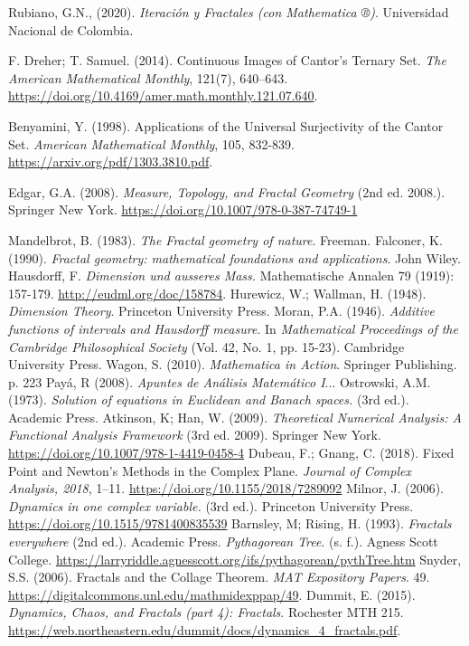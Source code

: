 \begin{thebibliography}{99}
    
 Rubiano, G.N., (2020). \textit{Iteración y Fractales (con Mathematica ®)}. Universidad Nacional de Colombia.

 F. Dreher; T. Samuel. (2014). Continuous Images of Cantor’s Ternary Set. \textit{The American Mathematical Monthly}, 121(7), 640–643. \url{https://doi.org/10.4169/amer.math.monthly.121.07.640}.

 Benyamini, Y. (1998). Applications of the Universal Surjectivity of the Cantor Set. \textit{American Mathematical Monthly}, 105, 832-839. \url{https://arxiv.org/pdf/1303.3810.pdf}.

 Edgar, G.A. (2008). \textit{Measure, Topology, and Fractal Geometry} (2nd ed. 2008.). Springer New York. \url{https://doi.org/10.1007/978-0-387-74749-1}

 Mandelbrot, B. (1983). \textit{The Fractal geometry of nature}. Freeman.
 Falconer, K. (1990). \textit{Fractal geometry: mathematical foundations and applications}. John Wiley.
 Hausdorff, F. \textit{Dimension und ausseres Mass.} Mathematische Annalen 79 (1919): 157-179. \url{http://eudml.org/doc/158784}.
Hurewicz, W.; Wallman, H. (1948). \textit{Dimension Theory}. Princeton University Press.
Moran, P.A. (1946). \textit{Additive functions of intervals and Hausdorff measure}. In \textit{Mathematical Proceedings of the Cambridge Philosophical Society} (Vol. 42, No. 1, pp. 15-23). Cambridge University Press.
Wagon, S. (2010). \textit{Mathematica in Action}. Springer Publishing. p. 223
 Payá, R (2008). \textit{Apuntes de Análisis Matemático I}...
 Ostrowski, A.M. (1973). \textit{Solution of equations in Euclidean and Banach spaces.} (3rd ed.). Academic Press.
 Atkinson, K; Han, W. (2009). \textit{Theoretical Numerical Analysis: A Functional Analysis Framework} (3rd ed. 2009). Springer New York. \url{https://doi.org/10.1007/978-1-4419-0458-4}
 Dubeau, F.; Gnang, C. (2018). Fixed Point and Newton’s Methods in the Complex Plane. \textit{Journal of Complex Analysis, 2018}, 1–11. \url{https://doi.org/10.1155/2018/7289092}
 Milnor, J. (2006). \textit{Dynamics in one complex variable.} (3rd ed.). Princeton University Press. \url{https://doi.org/10.1515/9781400835539}
 Barnsley, M; Rising, H. (1993). \textit{Fractals everywhere} (2nd ed.). Academic Press.
 \textit{Pythagorean Tree}. (s. f.). Agness Scott College. \url{https://larryriddle.agnesscott.org/ifs/pythagorean/pythTree.htm}
 Snyder, S.S. (2006). Fractals and the Collage Theorem. \textit{MAT Expository Papers}. 49. \url{https://digitalcommons.unl.edu/mathmidexppap/49}.
 Dummit, E. (2015). \textit{Dynamics, Chaos, and Fractals (part 4): Fractals}. Rochester MTH 215. \url{https://web.northeastern.edu/dummit/docs/dynamics_4_fractals.pdf}.


\end{thebibliography}
